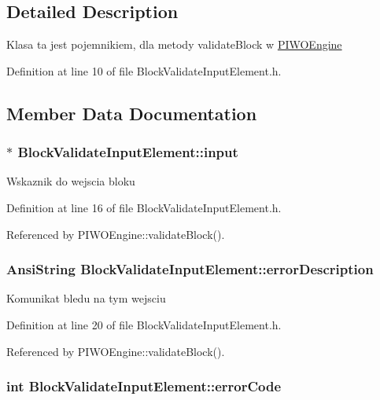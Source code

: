 \subsection{Detailed Description}
Klasa ta jest pojemnikiem, dla metody validateBlock w \hyperlink{classPIWOEngine}{PIWOEngine} 

Definition at line 10 of file BlockValidateInputElement.h.

\subsection{Member Data Documentation}
\hypertarget{classBlockValidateInputElement_26eb9998699990af1bd5c37d0c349756}{
\subsubsection[input]{$\ast$ {\bf BlockValidateInputElement::input}}}
\label{classBlockValidateInputElement_26eb9998699990af1bd5c37d0c349756}


Wskaznik do wejscia bloku 

Definition at line 16 of file BlockValidateInputElement.h.

Referenced by PIWOEngine::validateBlock().\hypertarget{classBlockValidateInputElement_fde55132868604704517be802a6d49d6}{
\subsubsection[errorDescription]{\setlength{\rightskip}{0pt plus 5cm}AnsiString {\bf BlockValidateInputElement::errorDescription}}}
\label{classBlockValidateInputElement_fde55132868604704517be802a6d49d6}


Komunikat bledu na tym wejsciu 

Definition at line 20 of file BlockValidateInputElement.h.

Referenced by PIWOEngine::validateBlock().\hypertarget{classBlockValidateInputElement_4bfede90be866e8bfdda42c48ef54153}{
\subsubsection[errorCode]{\setlength{\rightskip}{0pt plus 5cm}int {\bf BlockValidateInputElement::errorCode}}}
\label{classBlockValidateInputElement_4bfede90be866e8bfdda42c48ef54153}


